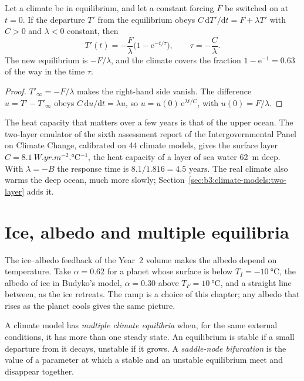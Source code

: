 \begin{theorem}\label{thm:b3:climate-models:response}
Let a climate be in equilibrium, and let a constant forcing $F$ be switched
on at $t = 0$. If the departure $T'$ from the equilibrium obeys $C\,\mathrm
dT'/\mathrm dt = F + \lambda T'$ with $C > 0$ and $\lambda < 0$ constant,
then
\[
T'(t) = -\frac{F}{\lambda}\Big(1 - \mathrm e^{-t/\tau}\Big), \qquad
\tau = -\frac{C}{\lambda} .
\]
The new equilibrium is $-F/\lambda$, and the climate covers the fraction $1
- \mathrm e^{-1} = \num{0.63}$ of the way in the time $\tau$.
\end{theorem}

\begin{proof}
$T'_\infty = -F/\lambda$ makes the right-hand side vanish. The difference
$u = T' - T'_\infty$ obeys $C\,\mathrm du/\mathrm dt = \lambda u$, so $u =
u(0)\,\mathrm e^{\lambda t/C}$, with $u(0) = F/\lambda$.
\end{proof}

The heat capacity that matters over a few years is that of the upper ocean.
The two-layer emulator of the sixth assessment report of the
Intergovernmental Panel on Climate Change, calibrated on 44 climate models,
gives the surface layer $C = \qty{8.1}{W.yr.m^{-2}.\celsius^{-1}}$, the heat
capacity of a layer of sea water \qty{62}{m} deep. With $\lambda = -B$ the
response time is $8.1/1.816 = \num{4.5}\text{ years}$. The real climate also warms
the deep ocean, much more slowly; Section~\ref{sec:b3:climate-models:two-layer}
adds it.

\section{Ice, albedo and multiple equilibria}\label{sec:b3:climate-models:multiple}

The ice--albedo feedback of the Year~2 volume makes the albedo depend on
temperature. Take $\alpha = 0.62$ for a planet whose surface is below
$T_I = \qty{-10}{\celsius}$, the albedo of ice in Budyko's model, $\alpha
= 0.30$ above $T_F = \qty{+10}{\celsius}$, and a straight line between, as
the ice retreats. The ramp is a choice of this chapter; any albedo that
rises as the planet cools gives the same picture.

\begin{definition}\label{def:b3:climate-models:multiple-equilibria}
A climate model has \emph{multiple climate equilibria}
when, for the same external conditions, it has more
than one steady state. An equilibrium is stable if a small departure from
it decays, unstable if it grows. A \emph{saddle-node
bifurcation} is the value of a parameter at
which a stable and an unstable equilibrium meet and disappear together.
\end{definition}

